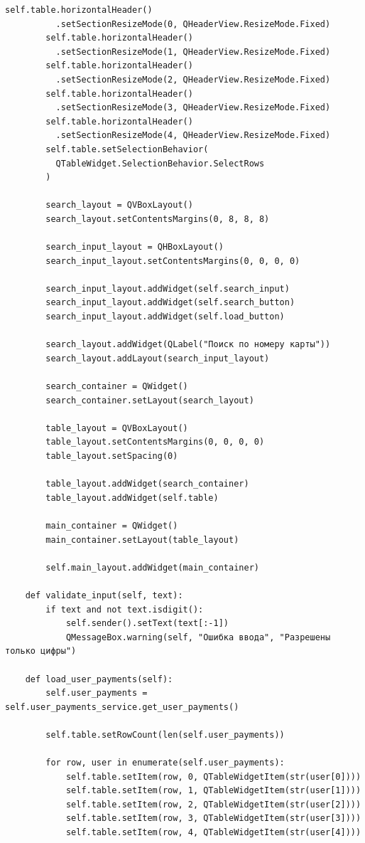 \documentclass[a4paper,14pt]{extarticle}
\begin{document}
\begin{Verbatim}[tabsize=4,fontsize=\small]
        self.table.horizontalHeader()
          .setSectionResizeMode(0, QHeaderView.ResizeMode.Fixed)
        self.table.horizontalHeader()
          .setSectionResizeMode(1, QHeaderView.ResizeMode.Fixed)
        self.table.horizontalHeader()
          .setSectionResizeMode(2, QHeaderView.ResizeMode.Fixed)
        self.table.horizontalHeader()
          .setSectionResizeMode(3, QHeaderView.ResizeMode.Fixed)
        self.table.horizontalHeader()
          .setSectionResizeMode(4, QHeaderView.ResizeMode.Fixed)
        self.table.setSelectionBehavior(
          QTableWidget.SelectionBehavior.SelectRows
        )

        search_layout = QVBoxLayout()
        search_layout.setContentsMargins(0, 8, 8, 8)

        search_input_layout = QHBoxLayout()
        search_input_layout.setContentsMargins(0, 0, 0, 0)

        search_input_layout.addWidget(self.search_input)
        search_input_layout.addWidget(self.search_button)
        search_input_layout.addWidget(self.load_button)

        search_layout.addWidget(QLabel("Поиск по номеру карты"))
        search_layout.addLayout(search_input_layout)

        search_container = QWidget()
        search_container.setLayout(search_layout)

        table_layout = QVBoxLayout()
        table_layout.setContentsMargins(0, 0, 0, 0)
        table_layout.setSpacing(0)

        table_layout.addWidget(search_container)
        table_layout.addWidget(self.table)

        main_container = QWidget()
        main_container.setLayout(table_layout)

        self.main_layout.addWidget(main_container)

    def validate_input(self, text):
        if text and not text.isdigit():
            self.sender().setText(text[:-1])
            QMessageBox.warning(self, "Ошибка ввода", "Разрешены только цифры")

    def load_user_payments(self):
        self.user_payments = self.user_payments_service.get_user_payments()

        self.table.setRowCount(len(self.user_payments))

        for row, user in enumerate(self.user_payments):
            self.table.setItem(row, 0, QTableWidgetItem(str(user[0])))
            self.table.setItem(row, 1, QTableWidgetItem(str(user[1])))
            self.table.setItem(row, 2, QTableWidgetItem(str(user[2])))
            self.table.setItem(row, 3, QTableWidgetItem(str(user[3])))
            self.table.setItem(row, 4, QTableWidgetItem(str(user[4])))


\end{Verbatim}
\end{document}

